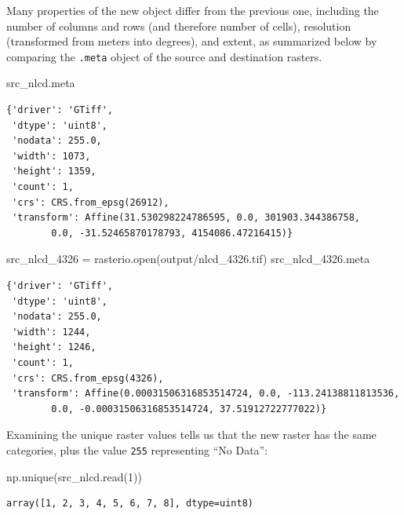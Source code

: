\documentclass[
  letterpaper,
]{krantz}
\newenvironment{Shaded}{\begin{snugshade}}{\end{snugshade}}
\newcommand{\BuiltInTok}[1]{\textcolor[rgb]{0.00,0.23,0.31}{#1}}
\newcommand{\DecValTok}[1]{\textcolor[rgb]{0.68,0.00,0.00}{#1}}
\newcommand{\NormalTok}[1]{\textcolor[rgb]{0.00,0.23,0.31}{#1}}
\newcommand{\OperatorTok}[1]{\textcolor[rgb]{0.37,0.37,0.37}{#1}}
\newcommand{\StringTok}[1]{\textcolor[rgb]{0.13,0.47,0.30}{#1}}
\begin{document}
Many properties of the new object differ from the previous one,
including the number of columns and rows (and therefore number of
cells), resolution (transformed from meters into degrees), and extent,
as summarized below by comparing the \texttt{.meta} object of the source
and destination rasters.

\begin{Shaded}
\begin{Highlighting}[]
\NormalTok{src\_nlcd.meta}
\end{Highlighting}
\end{Shaded}

\begin{verbatim}
{'driver': 'GTiff',
 'dtype': 'uint8',
 'nodata': 255.0,
 'width': 1073,
 'height': 1359,
 'count': 1,
 'crs': CRS.from_epsg(26912),
 'transform': Affine(31.530298224786595, 0.0, 301903.344386758,
        0.0, -31.52465870178793, 4154086.47216415)}
\end{verbatim}

\begin{Shaded}
\begin{Highlighting}[]
\NormalTok{src\_nlcd\_4326 }\OperatorTok{=}\NormalTok{ rasterio.}\BuiltInTok{open}\NormalTok{(}\StringTok{\textquotesingle{}output/nlcd\_4326.tif\textquotesingle{}}\NormalTok{)}
\NormalTok{src\_nlcd\_4326.meta}
\end{Highlighting}
\end{Shaded}

\begin{verbatim}
{'driver': 'GTiff',
 'dtype': 'uint8',
 'nodata': 255.0,
 'width': 1244,
 'height': 1246,
 'count': 1,
 'crs': CRS.from_epsg(4326),
 'transform': Affine(0.00031506316853514724, 0.0, -113.24138811813536,
        0.0, -0.00031506316853514724, 37.51912722777022)}
\end{verbatim}

Examining the unique raster values tells us that the new raster has the
same categories, plus the value \texttt{255} representing ``No Data'':

\begin{Shaded}
\begin{Highlighting}[]
\NormalTok{np.unique(src\_nlcd.read(}\DecValTok{1}\NormalTok{))}
\end{Highlighting}
\end{Shaded}

\begin{verbatim}
array([1, 2, 3, 4, 5, 6, 7, 8], dtype=uint8)
\end{verbatim}
\end{document}
